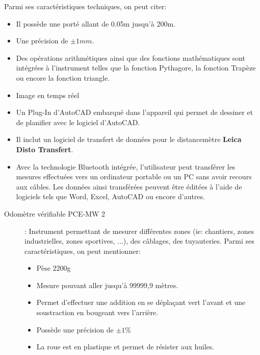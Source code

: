 \documentclass[a4paper, 12pt]{book}
\begin{document}
\begin{description}
 Parmi ses caractéristiques techniques, on peut citer:
	\begin{itemize}
		\item Il possède une porté allant de 0.05m jusqu'à 200m.
		\item Une précision de $\pm 1mm$.
		\item Des opérations arithmétiques ainsi que des fonctions mathématiques sont intégrées à l'instrument telles que la fonction Pythagore, la fonction Trapèze ou encore la fonction triangle.
		\item Image en temps réel 
		\item Un Plug-In d'AutoCAD embarqué dans l'appareil qui permet de dessiner et de planifier avec le logiciel d'AutoCAD.
		\item Il inclut un logiciel de transfert de données pour le distancemètre  \textbf{Leica Disto Transfert}.
		\item Avec la technologie Bluetooth intégrée, l'utilisateur peut transférer les mesures effectuées vers un ordinateur portable ou un PC sans avoir recours aux câbles. Les données ainsi transférées peuvent être éditées à l'aide de logiciels tels que Word, Excel, AutoCAD ou encore d'autres.  
	\end{itemize}
\end{description}

\begin{description}
	\item[Odomètre vérifiable PCE-MW 2]: Instrument permettant de mesurer différentes zones (ie: chantiers, zones industrielles, zones sportives, ...), des câblages, des tuyauteries. Parmi ses caractéristiques, on peut mentionner:
	\begin{itemize}
		\item Pèse 2200g
		\item Mesure pouvant aller jusqu'à 99999,9 mètres.
		\item Permet d'effectuer une addition en se déplaçant vert l'avant et une soustraction en bougeant vers l'arrière.
		\item Possède une précision de $\pm 1\%$
		\item La roue est en plastique et permet de résister aux huiles.
	\end{itemize}	
\end{description}
\end{document}
